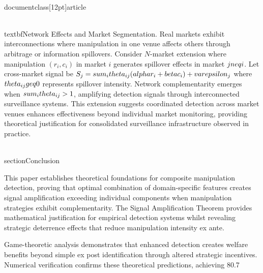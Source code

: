 \\documentclass[12pt]{article}
\begin{document}
\\textbf{Network Effects and Market Segmentation.} Real markets exhibit interconnections where manipulation in one venue affects others through arbitrage or information spillovers. Consider $N$-market extension where manipulation $(r_i, c_i)$ in market $i$ generates spillover effects in market $j \\neq i$. Let cross-market signal be $S_j = \\sum_{i} \\theta_{ij}(\\alpha r_i + \\beta c_i) + \\varepsilon_j$ where $\\theta_{ij} \\geq 0$ represents spillover intensity. Network complementarity emerges when $\\sum_i \\theta_{ij} > 1$, amplifying detection signals through interconnected surveillance systems. This extension suggests coordinated detection across market venues enhances effectiveness beyond individual market monitoring, providing theoretical justification for consolidated surveillance infrastructure observed in practice.

\\section{Conclusion}

This paper establishes theoretical foundations for composite manipulation detection, proving that optimal combination of domain-specific features creates signal amplification exceeding individual components when manipulation strategies exhibit complementarity. The Signal Amplification Theorem provides mathematical justification for empirical detection systems whilst revealing strategic deterrence effects that reduce manipulation intensity ex ante.

Game-theoretic analysis demonstrates that enhanced detection creates welfare benefits beyond simple ex post identification through altered strategic incentives. Numerical verification confirms these theoretical predictions, achieving 80.7\\%
\end{document}

